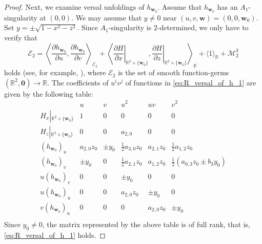 \documentclass[12pt]{amsart}
\theoremstyle{plain}
\theoremstyle{definition}
\newcommand{\R}{\mathbb{R}}
\begin{document}
\begin{proof}
Next, we examine versal unfoldings of $h_{\bm{w}_0}$.
Assume that $h_{\bm{w}_0}$ has an $A_1$-singularity at $(0,0)$.
We may assume that $y\ne0$ near $(u,v,\bm{w})=(0,0,\bm{w}_0)$.
Set $y = \pm \sqrt{1-x^2-z^2}$.
Since $A_1$-singularity is 2-determined, we only have to verify that
\begin{equation}
\label{eq:R_versal_of_h_1}
\mathcal{E}_2 = \left\langle\dfrac{\partial h_{\bm{w}_0}}{\partial u},\dfrac{\partial h_{\bm{w}_0}}{\partial v}\right\rangle_{\mathcal{E}_2} +\left\langle\left.\dfrac{\partial H}{\partial x}\right|_{\R^2\times\{\bm{w}_0\}}, \left.\dfrac{\partial H}{\partial z}\right|_{\R^2\times\{\bm{w}_0\}}\right\rangle_{\R} + \langle 1 \rangle_{\R} + \mathcal{M}_2^3
\end{equation}
holds (see, for example, %
\cite{Martinet1982}), where $\mathcal{E}_2$ is the set of smooth function-germs $(\R^2,\bm{0})\to\R$.
The coefficients of $u^i v^j$ of functions in \eqref{eq:R_versal_of_h_1} are given by the following table:
\[
\begin{array}{c|cc|ccc}
& u & v & u^2 & u v & v^2 \\ \hline
H_x\left|_{\R^2\times\{\bm{w}_0\}}\right. & 1 & 0 & 0 & 0 & 0 \\
H_z\left|_{\R^2\times\{\bm{w}_0\}}\right. & 0 & 0 & a_{2,0} & 0 & 0 \\ \hline
(h_{\bm{w}_0})_u & a_{2,0} z_0 & \pm y_0 & \frac12 a_{3,0} z_0 & a_{2,1} z_0 & \frac12 a_{1,2} z_0 \\
(h_{\bm{w}_0})_v & \pm y_0 & 0 & \frac12 a_{2,1} z_0 & a_{1,2} z_0 & \frac12(a_{0,3} z_0 \pm b_3 y_0) \\ \hline
u (h_{\bm{w}_0})_v & 0 & 0 & \pm y_0 & 0 & 0 \\
u (h_{\bm{w}_0})_u & 0 & 0 & a_{2,0} z_0 & \pm y_0 & 0 \\
v (h_{\bm{w}_0})_u & 0 & 0 & 0 & a_{2,0} z_0 & \pm y_0\\
\end{array}
 \]
Since $y_0 \ne 0$, the matrix represented by the above table is of full rank, that is, \eqref{eq:R_versal_of_h_1} holds.


\end{proof}
\end{document}
